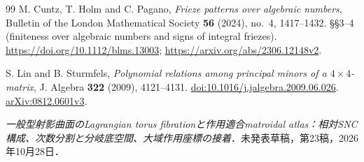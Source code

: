 \begin{thebibliography}{99}
M. Cuntz, T. Holm and C. Pagano,
\emph{Frieze patterns over algebraic numbers},
Bulletin of the London Mathematical Society \textbf{56} (2024), no.~4, 1417--1432.
\S\S3--4 (finiteness over algebraic numbers and signs of integral friezes).
\url{https://doi.org/10.1112/blms.13003};
\url{https://arxiv.org/abs/2306.12148v2}.

S. Lin and B. Sturmfels,
\emph{Polynomial relations among principal minors of a $4\times4$-matrix},
J. Algebra \textbf{322} (2009), 4121--4131.
\href{https://doi.org/10.1016/j.jalgebra.2009.06.026}{doi:10.1016/j.jalgebra.2009.06.026}.
\href{https://arxiv.org/abs/0812.0601}{arXiv:0812.0601v3}.

\emph{一般型射影曲面のLagrangian torus fibrationと作用適合matroidal atlas：相対SNC構成、次数分割と分岐底空間、大域作用座標の接着}．未発表草稿，第23稿，2026年10月28日．

\end{thebibliography}
